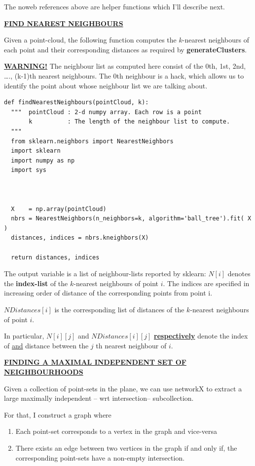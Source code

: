 \documentclass[11pt]{article}
\begin{document}
The noweb references above are helper functions which I'll describe next. 

\textbf{\uline{FIND NEAREST NEIGHBOURS}}

Given a point-cloud, the following function computes the $k$-nearest neighbours of each 
point and their corresponding distances as required by \textbf{generateClusters}. 


 \textbf{\uline{WARNING!}} The neighbour list as computed here consist of the 0th, 1st, 2nd, \ldots{}., 
(k-1)th nearest neighbours. The 0th neighbour is a hack, which allows us to identify 
the point about whose neighbour list we are talking about. 

\begin{verbatim}
def findNearestNeighbours(pointCloud, k):
  """  pointCloud : 2-d numpy array. Each row is a point
       k          : The length of the neighbour list to compute. 
  """
  from sklearn.neighbors import NearestNeighbors
  import sklearn
  import numpy as np
  import sys



  X    = np.array(pointCloud)
  nbrs = NearestNeighbors(n_neighbors=k, algorithm='ball_tree').fit( X )
  distances, indices = nbrs.kneighbors(X)

  return distances, indices
\end{verbatim}

The output variable is a list of neighbour-lists reported by sklearn: $N[i]$ denotes the \textbf{index-list} of the 
$k$-nearest neighbours of point $i$. The indices are specified in increasing order of distance of the corresponding 
points from point i. 

$NDistances[i]$ is the corresponding list of distances of the $k$-nearest neighbours of point $i$. 

In particular, $N[i][j]$ and $NDistances[i][j]$ \uline{\textbf{respectively}} denote the index of \uline{and} distance between the $j$ th nearest 
neighbour of $i$. 


\uline{\textbf{FINDING A MAXIMAL INDEPENDENT SET OF NEIGHBOURHOODS}}


Given a collection of point-sets in the plane, we can use networkX to extract a large maximally independent -- wrt intersection--
subcollection. 

For that, I construct a graph where 
\begin{enumerate}
\item Each point-set corresponds to a vertex in the graph and vice-versa
\item There exists an edge between two vertices in the graph if and only if, 
the corresponding point-sets have a non-empty intersection.
\end{enumerate}
\end{document}
